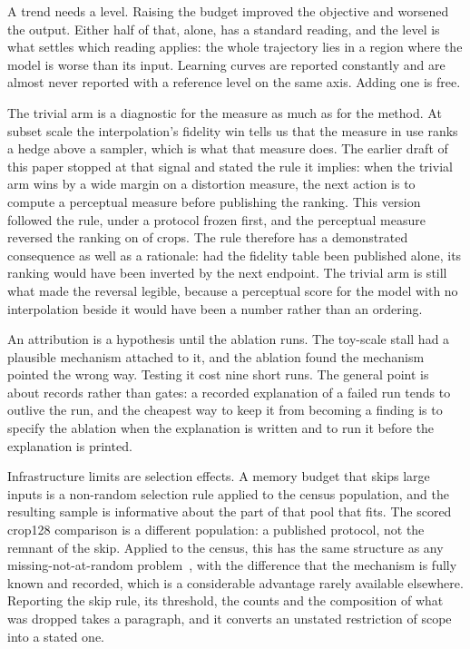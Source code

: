 A trend needs a level. Raising the budget \BudgetFold{} improved the objective
and worsened the output. Either half of that, alone, has a standard reading,
and the level is what settles which reading applies: the whole trajectory lies
in a region where the model is worse than its input. Learning curves are
reported constantly and are almost never reported with a reference level on the
same axis. Adding one is free.

The trivial arm is a diagnostic for the measure as much as for the method. At
subset scale the interpolation's fidelity win tells us that the measure in use
ranks a hedge above a sampler, which is what that measure does. The earlier
draft of this paper stopped at that signal and stated the rule it implies: when
the trivial arm wins by a wide margin on a distortion measure, the next action
is to compute a perceptual measure before publishing the ranking. This version
followed the rule, under a protocol frozen first, and the perceptual measure
reversed the ranking on \LpipsWins{} of \SubsetN{} crops. The rule therefore
has a demonstrated consequence as well as a rationale: had the fidelity table
been published alone, its ranking would have been inverted by the next
endpoint. The trivial arm is still what made the reversal legible, because a
perceptual score for the model with no interpolation beside it would have been
a number rather than an ordering.

An attribution is a hypothesis until the ablation runs. The toy-scale stall had
a plausible mechanism attached to it, and the ablation found the mechanism
pointed the wrong way. Testing it cost nine short runs. The general point is
about records rather than gates: a recorded explanation of a failed run tends
to outlive the run, and the cheapest way to keep it from becoming a finding is
to specify the ablation when the explanation is written and to run it before
the explanation is printed.

Infrastructure limits are selection effects. A memory budget that skips large
inputs is a non-random selection rule applied to the census population, and the
resulting sample is informative about the part of that pool that fits. The
scored crop128 comparison is a different population: a published protocol, not
the remnant of the skip. Applied to the census, this has the same structure as
any missing-not-at-random problem~\cite{rubin1976inference}, with the
difference that the mechanism is fully known and recorded, which is a
considerable advantage rarely available elsewhere. Reporting the skip rule, its
threshold, the counts and the composition of what was dropped takes a
paragraph, and it converts an unstated restriction of scope into a stated one.

